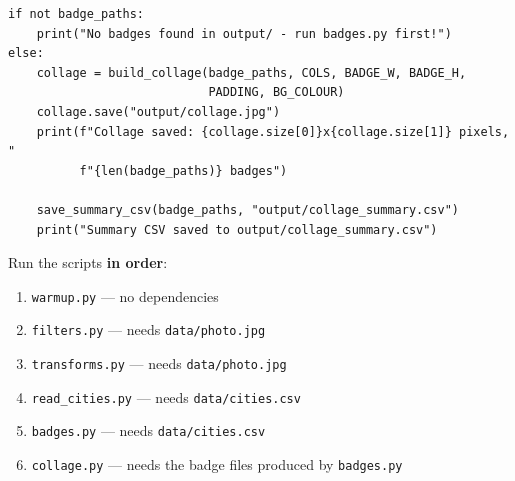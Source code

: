 \documentclass{cslab}
\begin{document}
\begin{lstlisting}
if not badge_paths:
    print("No badges found in output/ - run badges.py first!")
else:
    collage = build_collage(badge_paths, COLS, BADGE_W, BADGE_H,
                            PADDING, BG_COLOUR)
    collage.save("output/collage.jpg")
    print(f"Collage saved: {collage.size[0]}x{collage.size[1]} pixels, "
          f"{len(badge_paths)} badges")

    save_summary_csv(badge_paths, "output/collage_summary.csv")
    print("Summary CSV saved to output/collage_summary.csv")
\end{lstlisting}

\begin{note}
Run the scripts \textbf{in order}:
\begin{enumerate}
    \item \texttt{warmup.py} --- no dependencies
    \item \texttt{filters.py} --- needs \texttt{data/photo.jpg}
    \item \texttt{transforms.py} --- needs \texttt{data/photo.jpg}
    \item \texttt{read\_cities.py} --- needs \texttt{data/cities.csv}
    \item \texttt{badges.py} --- needs \texttt{data/cities.csv}
    \item \texttt{collage.py} --- needs the badge files produced by \texttt{badges.py}
\end{enumerate}
\end{note}
\end{document}
